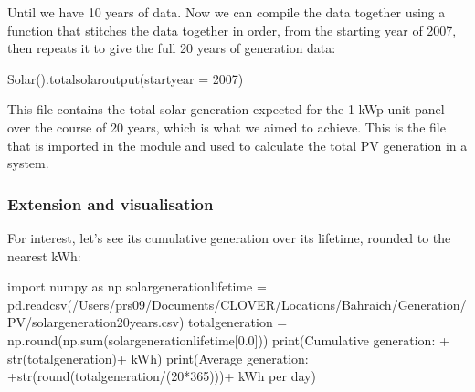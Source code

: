 \documentclass[letterpaper,10pt,english]{sphinxmanual}
\begin{document}
\sphinxAtStartPar
Until we have 10 years of data. Now we can compile the data together
using a function that stitches the data together in order, from the
starting year of 2007, then repeats it to give the full 20 years of
generation data:

\begin{sphinxVerbatim}[commandchars=\\\{\}]
Solar().total\PYGZus{}solar\PYGZus{}output(start\PYGZus{}year = 2007)
\end{sphinxVerbatim}

\sphinxAtStartPar
This file contains the total solar generation expected for the 1 kWp
unit panel over the course of 20 years, which is what we aimed to
achieve. This is the file that is imported in the  module
and used to calculate the total PV generation in a system. 


\subsubsection{Extension and visualisation}
\label{\detokenize{electricity_generation:extension-and-visualisation}}
\sphinxAtStartPar
For interest, let’s see its cumulative generation over its lifetime,
rounded to the nearest kWh:

\begin{sphinxVerbatim}[commandchars=\\\{\}]
import numpy as np
solar\PYGZus{}generation\PYGZus{}lifetime = pd.read\PYGZus{}csv(\PYGZdq{}/Users/prs09/Documents/CLOVER/Locations/Bahraich/Generation/PV/solar\PYGZus{}generation\PYGZus{}20\PYGZus{}years.csv\PYGZdq{})
total\PYGZus{}generation = np.round(np.sum(solar\PYGZus{}generation\PYGZus{}lifetime[\PYGZsq{}0.0\PYGZsq{}]))
print(\PYGZsq{}Cumulative generation: \PYGZsq{} + str(total\PYGZus{}generation)+\PYGZsq{} kWh\PYGZsq{})
print(\PYGZsq{}Average generation: \PYGZsq{}+str(round(total\PYGZus{}generation/(20*365)))+\PYGZsq{} kWh per day\PYGZsq{})
\end{sphinxVerbatim}

\begin{sphinxVerbatim}[commandchars=\\\{\}]
   
     
\end{sphinxVerbatim}
\end{document}
